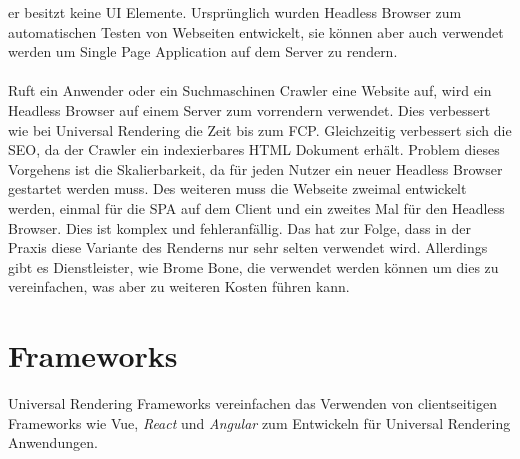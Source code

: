 \documentclass[runningheads]{llncs}
\numberwithin{figure}{section}
\begin{document}
er besitzt keine UI Elemente. 
Ursprünglich wurden Headless Browser zum automatischen Testen von Webseiten entwickelt, 
sie können aber auch verwendet werden um Single Page Application auf dem Server zu rendern. 
\\
\\
Ruft ein Anwender oder ein Suchmaschinen Crawler eine Website auf, 
wird ein Headless Browser auf einem Server zum vorrendern verwendet. 
Dies verbessert wie bei Universal Rendering die Zeit bis zum FCP. Gleichzeitig verbessert sich die SEO, da der Crawler ein indexierbares HTML Dokument erhält. 
Problem dieses Vorgehens ist die Skalierbarkeit, 
da für jeden Nutzer ein neuer Headless Browser gestartet werden muss. 
Des weiteren muss die Webseite zweimal entwickelt werden, 
einmal für die SPA auf dem Client und ein zweites Mal für den Headless Browser. 
Dies ist komplex und fehleranfällig. Das hat zur Folge, 
dass in der Praxis diese Variante des Renderns nur sehr selten verwendet wird. 
Allerdings gibt es Dienstleister, wie Brome Bone, 
die verwendet werden können um dies zu vereinfachen, 
was aber zu weiteren Kosten führen kann.

\newpage

\section{Frameworks}
\label{sec:Frameworks}
Universal Rendering Frameworks vereinfachen das Verwenden von clientseitigen Frameworks wie Vue, 
\textit{React} und \textit{Angular} zum Entwickeln für Universal Rendering Anwendungen. 
\end{document}
